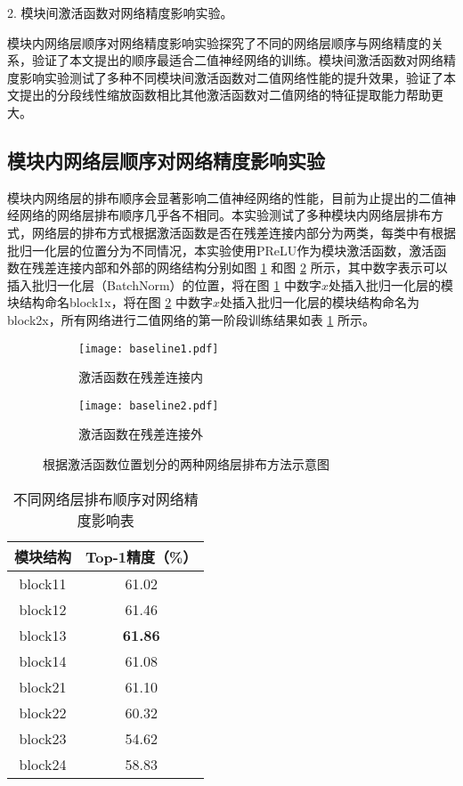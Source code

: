 2. 模块间激活函数对网络精度影响实验。

模块内网络层顺序对网络精度影响实验探究了不同的网络层顺序与网络精度的关系，验证了本文提出的顺序最适合二值神经网络的训练。模块间激活函数对网络精度影响实验测试了多种不同模块间激活函数对二值网络性能的提升效果，验证了本文提出的分段线性缩放函数相比其他激活函数对二值网络的特征提取能力帮助更大。

\subsection{模块内网络层顺序对网络精度影响实验}

模块内网络层的排布顺序会显著影响二值神经网络的性能，目前为止提出的二值神经网络的网络层排布顺序几乎各不相同。本实验测试了多种模块内网络层排布方式，网络层的排布方式根据激活函数是否在残差连接内部分为两类，每类中有根据批归一化层的位置分为不同情况，本实验使用PReLU作为模块激活函数，激活函数在残差连接内部和外部的网络结构分别如图 \ref{fig:baseline1} 和图 \ref{fig:baseline2} 所示，其中数字表示可以插入批归一化层（BatchNorm）的位置，将在图 \ref{fig:baseline1} 中数字$x$处插入批归一化层的模块结构命名block1x，将在图 \ref{fig:baseline2} 中数字$x$处插入批归一化层的模块结构命名为block2x，所有网络进行二值网络的第一阶段训练结果如表 \ref{tab:42} 所示。

\begin{figure}[htbp]
  \vspace{6pt}
  \centering
  \begin{subfigure}{0.4\textwidth}
    \centering
    \texttt{[image: baseline1.pdf]}
    \caption{激活函数在残差连接内}
    \label{fig:baseline1}
  \end{subfigure}
  \begin{subfigure}{0.4\textwidth}
    \centering
    \texttt{[image: baseline2.pdf]}
    \caption{激活函数在残差连接外}
    \label{fig:baseline2}
  \end{subfigure}
  \caption{根据激活函数位置划分的两种网络层排布方法示意图}
  \label{fig:baseline}
  \vspace{6pt}
\end{figure}

\begin{table}[h]
  \vspace{6pt}
  \centering
  \caption{不同网络层排布顺序对网络精度影响表}
  \label{tab:42}
  \begin{tabular}{cc}
    \toprule
    模块结构 & Top-1精度（\%） \\
    \midrule
    block11 & 61.02 \\
    block12 & 61.46 \\
    block13 & \textbf{61.86} \\
    block14 & 61.08 \\
    block21 & 61.10 \\
    block22 & 60.32 \\
    block23 & 54.62 \\
    block24 & 58.83 \\
    \bottomrule
  \end{tabular}
  \vspace{6pt}
\end{table}

